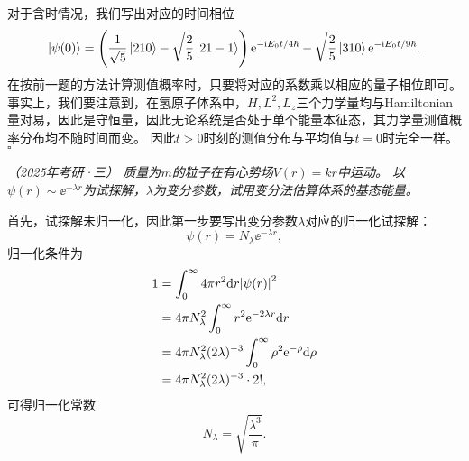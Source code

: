 \begin{tcolorbox}[breakable, title={\textbf{例题：氢原子能级叠加态}}]
    对于含时情况，我们写出对应的时间相位
    \begin{equation}
        \ket{\psi(0)} = \left(\frac{1}{\sqrt{5}}\ket{210} - \sqrt{\frac25}\ket{21-1}\right) \mathrm{e}^{-\mathrm{i} E_0 t/4\hbar} - \sqrt{\frac25}\ket{310} \mathrm{e}^{-\mathrm{i} E_0 t/9\hbar}.
    \end{equation}
    在按前一题的方法计算测值概率时，只要将对应的系数乘以相应的量子相位即可。
    事实上，我们要注意到，在氢原子体系中，$H, L^2, L_z$三个力学量均与Hamiltonian量对易，因此是守恒量，因此无论系统是否处于单个能量本征态，其力学量测值概率分布均不随时间而变。
    因此$t>0$时刻的测值分布与平均值与$t=0$时完全一样。
    \hfill $\square$

\end{tcolorbox}

\begin{tcolorbox}[breakable, title={\textbf{例题}}]
    \it\small
     （2025年考研·三）
    质量为$m$的粒子在有心势场$V(r)=kr$中运动。
    以$\psi(r)\sim\ee^{-\lambda r}$为试探解，$\lambda$为变分参数，试用变分法估算体系的基态能量。


    首先，试探解未归一化，因此第一步要写出变分参数$\lambda$对应的归一化试探解：
    \begin{equation}
        \psi(r) = N_\lambda \ee^{-\lambda r},
    \end{equation}
    归一化条件为
    \begin{equation}
    \begin{aligned}
        1 &= \int_0^\infty 4\pi r^2 \dd r \abs{\psi(r)}^2 \\
        &= 4\pi N_\lambda^2 \int_0^\infty r^2 \mathrm{e}^{-2\lambda r} \dd r \\
        &= 4\pi N_\lambda^2 (2\lambda)^{-3} \int_0^\infty \rho^2 \mathrm{e}^{-\rho} \dd\rho \\
        &= 4\pi N_\lambda^2 (2\lambda)^{-3} \cdot 2!,
    \end{aligned}
    \end{equation}
    可得归一化常数
    \begin{equation}
        N_\lambda = \sqrt{\frac{\lambda^3}{\pi}}.
    \end{equation}


\end{tcolorbox}
